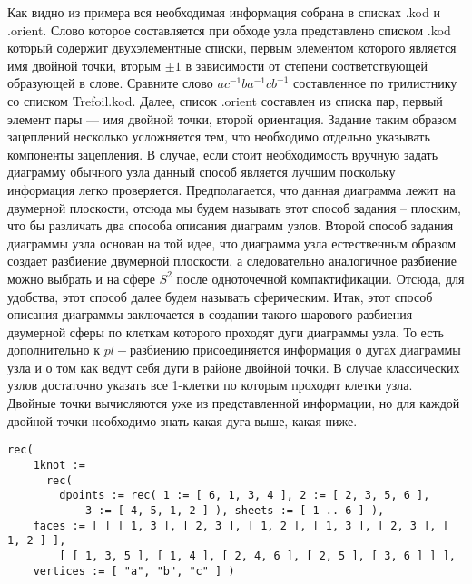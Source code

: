 \documentclass[a4paper,11pt]{report}
\begin{document}
{{{\begin{Verbatim}[commandchars=!@|,fontsize=\small,frame=single,label=Пример]
\end{Verbatim}
 Как
видно
из
примера
вся
необходимая
информация
собрана
в
списках
.kod и .orient.
Слово
которое
составляется
при
обходе
узла
представлено
списком
.kod
который
содержит
двухэлементные
списки,
первым
элементом
которого
является
имя
двойной
точки,
вторым $\pm 1$ в
зависимости
от
степени
соответствующей
образующей
в
слове.
Сравните
слово $ac^{-1}ba^{-1}cb^{-1}$ составленное
по
трилистнику
со
списком
Trefoil.kod.
Далее,
список
.orient
составлен
из
списка
пар,
первый
элемент
пары ---
имя
двойной
точки,
второй
ориентация.  Задание
таким
образом
зацеплений
несколько
усложняется
тем,
что
необходимо
отдельно
указывать
компоненты
зацепления.
В
случае,
если
стоит
необходимость
вручную
задать
диаграмму
обычного
узла
данный
способ
является
лучшим
поскольку
информация
легко
проверяется.
Предполагается,
что
данная
диаграмма
лежит
на
двумерной
плоскости,
отсюда
мы
будем
называть
этот
способ
задания
--
плоским,
что бы
различать
два
способа
описания
диаграмм
узлов.
Второй
способ
задания
диаграммы
узла
основан
на той
идее,
что
диаграмма
узла
естественным
образом
создает
разбиение
двумерной
плоскости,
а
следовательно
аналогичное
разбиение
можно
выбрать
и на
сфере $S^2$ после
одноточечной
компактификации.
Отсюда,
для
удобства,
этот
способ
далее
будем
называть
сферическим.
Итак,
этот
способ
описания
диаграммы
заключается
в
создании
такого
шарового
разбиения
двумерной
сферы
по
клеткам
которого
проходят
дуги
диаграммы
узла.
То
есть
дополнительно
к $pl-$разбиению
присоединяется
информация
о
дугах
диаграммы
узла и
о том
как
ведут
себя
дуги в
районе
двойной
точки.
В
случае
классических
узлов
достаточно
указать
все
1-клетки
по
которым
проходят
клетки
узла.
Двойные
точки
вычисляются
уже из
представленной
информации,
но для
каждой
двойной
точки
необходимо
знать
какая
дуга
выше,
какая
ниже. 
\begin{Verbatim}[commandchars=!@|,fontsize=\small,frame=single,label=Пример]
  rec(
    1knot :=
      rec(
        dpoints := rec( 1 := [ 6, 1, 3, 4 ], 2 := [ 2, 3, 5, 6 ],
            3 := [ 4, 5, 1, 2 ] ), sheets := [ 1 .. 6 ] ),
    faces := [ [ [ 1, 3 ], [ 2, 3 ], [ 1, 2 ], [ 1, 3 ], [ 2, 3 ], [ 1, 2 ] ],
        [ [ 1, 3, 5 ], [ 1, 4 ], [ 2, 4, 6 ], [ 2, 5 ], [ 3, 6 ] ] ],
    vertices := [ "a", "b", "c" ] )
  			

\end{Verbatim}}}}
\end{document}
